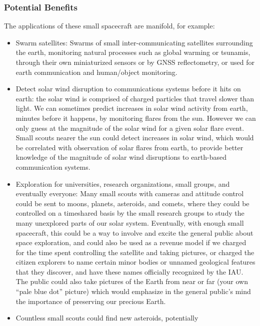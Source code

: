 \documentclass[letter,11pt]{article}
\begin{document}
\subsubsection{Potential Benefits}

The applications of these small spacecraft are manifold, for example:
\begin{itemize}
	\item Swarm satellites:  Swarms of small inter-communicating satellites
		surrounding the earth, monitoring natural processes such as global warming
		or tsunamis, through their own miniaturized sensors or by GNSS
		reflectometry, or used for earth communication and human/object monitoring.
	\item Detect solar wind disruption to communications systems before it hits
		on earth: the solar wind is comprised of charged particles that travel
		slower than light. We can sometimes predict increases in solar wind
		activity from earth, minutes before it happens, by monitoring flares from
		the sun. However we can only guess at the magnitude of the solar wind for a
		given solar flare event. Small scouts nearer the sun could detect increases
		in solar wind, which would be correlated with observation of solar flares
		from earth, to provide better knowledge of the magnitude of solar wind
		disruptions to earth-based communication systems.
	\item Exploration for universities, research organizations, small groups, and
		eventually everyone: Many small scouts with cameras and attitude control
		could be sent to moons, planets, asteroids, and comets, where they could be
		controlled on a timeshared basis by the small research groups to study the
		many unexplored parts of our solar system. Eventually, with enough small
		spacecraft, this could be a way to involve and excite the general public
		about space exploration, and could also be used as a revenue model if we
		charged for the time spent controlling the satellite and taking pictures,
		or charged the citizen explorers to name certain minor bodies or unnamed
		geological features that they discover, and have these names officially
		recognized by the IAU. The public could also take pictures of the Earth
		from near or far (your own ``pale blue dot'' picture) which would emphasize
		in the general public's mind the importance of preserving our precious
		Earth.
	\item Countless small scouts could find new asteroids, potentially

\end{itemize}
\end{document}
